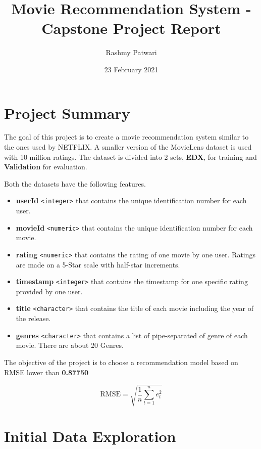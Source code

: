 \documentclass[
]{article}
\title{Movie Recommendation System - Capstone Project Report}
\author{Rashmy Patwari}
\date{23 February 2021}
\providecommand{\tightlist}{%
  \setlength{\itemsep}{0pt}\setlength{\parskip}{0pt}}
\begin{document}
\maketitle

{
\setcounter{tocdepth}{2}
\tableofcontents
}
\newpage

\hypertarget{project-summary}{%
\section{Project Summary}\label{project-summary}}

The goal of this project is to create a movie recommendation system
similar to the ones used by NETFLIX. A smaller version of the MovieLens
dataset is used with 10 million ratings. The dataset is divided into 2
sets, \textbf{EDX}, for training and \textbf{Validation} for evaluation.

Both the datasets have the following features.

\begin{itemize}
\tightlist
\item
  \textbf{userId} \texttt{\textless{}integer\textgreater{}} that
  contains the unique identification number for each user.
\item
  \textbf{movieId} \texttt{\textless{}numeric\textgreater{}} that
  contains the unique identification number for each movie.
\item
  \textbf{rating} \texttt{\textless{}numeric\textgreater{}} that
  contains the rating of one movie by one user. Ratings are made on a
  5-Star scale with half-star increments.
\item
  \textbf{timestamp} \texttt{\textless{}integer\textgreater{}} that
  contains the timestamp for one specific rating provided by one user.
\item
  \textbf{title} \texttt{\textless{}character\textgreater{}} that
  contains the title of each movie including the year of the release.
\item
  \textbf{genres} \texttt{\textless{}character\textgreater{}} that
  contains a list of pipe-separated of genre of each movie. There are
  about 20 Genres.
\end{itemize}

The objective of the project is to choose a recommendation model based
on RMSE lower than \textbf{0.87750}

\[\mbox{RMSE} = \sqrt{\frac{1}{n}\sum_{t=1}^{n}e_t^2}\]

\hypertarget{initial-data-exploration}{%
\section{Initial Data Exploration}\label{initial-data-exploration}}
\end{document}
